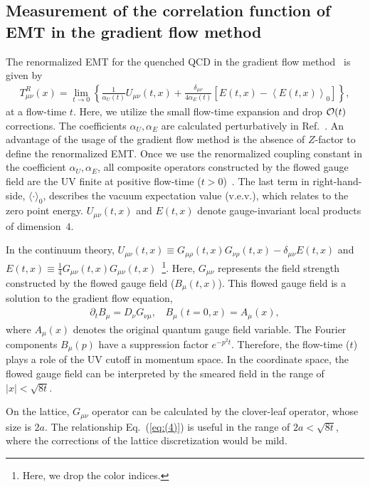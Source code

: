 \documentclass[a4paper,11pt]{article}
\newcommand\beq{ \begin{eqnarray} }
\newcommand\eeq{ \end{eqnarray} }
\begin{document}
\subsection{Measurement of the correlation function of EMT in the gradient flow method}\label{sec:EMT}
The renormalized EMT for the quenched QCD in the gradient flow method~\cite{Suzuki:2013gza} is given by 
\begin{align}
   T_{\mu\nu}^R(x)
   =\lim_{t\to0}\left\{\frac{1}{\alpha_U(t)}U_{\mu\nu}(t,x)
   +\frac{\delta_{\mu\nu}}{4\alpha_E(t)}
   \left[E(t,x)-\left\langle E(t,x)\right\rangle_0 \right]\right\},
\label{eq:(4)}
\end{align}
at a flow-time $t$.
Here, we utilize the small flow-time expansion and drop ${\cal O} (t)$ corrections.
The coefficients $\alpha_U,\alpha_E$ are calculated perturbatively in Ref.~\cite{Suzuki:2013gza}.
An advantage of the usage of the gradient flow method is the absence of $Z$-factor to define the renormalized EMT.
Once we use the renormalized coupling constant in the coefficient $\alpha_U, \alpha_E$, all composite operators constructed by the flowed gauge field are the UV finite at positive flow-time ($t>0$)~\cite{Luscher:2011bx}.
The last term in right-hand-side, $\langle\cdot\rangle_0$, describes the vacuum expectation value (v.e.v.), which relates to the zero point energy. 
$U_{\mu \nu}(t,x)$ and $E(t,x)$ denote gauge-invariant local products of dimension~$4$.


In the continuum theory,  
$U_{\mu\nu}(t,x)\equiv G_{\mu\rho}(t,x)G_{\nu\rho}(t,x)
-\delta_{\mu\nu} E(t,x)$
and~$E(t,x)\equiv\frac{1}{4}G_{\mu\nu}(t,x)G_{\mu\nu}(t,x)$~\footnote{Here, we drop the color indices.}.
Here, $G_{\mu \nu}$ represents the field strength constructed by the flowed gauge field ($B_{\mu}(t,x)$).
This flowed gauge field is a solution to the gradient flow equation,  
\beq
\partial_t B_{\mu} = D_{\nu} G_{\nu \mu}, ~~~~ B_{\mu} (t=0,x) = A_{\mu}(x),\label{eq:gflow}
\eeq
where $A_{\mu}(x)$ denotes the original quantum gauge field variable.
The Fourier components $B_\mu (p)$ have a suppression factor $e^{-p^2t}$.
 Therefore, the flow-time ($t$) plays a role of the UV cutoff in momentum space. 
In the coordinate space, the flowed gauge field can be interpreted by the smeared field in the range of $|x| < \sqrt{8t}$.

On the lattice, $G_{\mu \nu}$ operator can be calculated by the clover-leaf operator, whose size is $2a$.
The relationship Eq.~(\ref{eq:(4)}) is useful in the range of $2a < \sqrt{8t}$, where the corrections of the lattice discretization  would be mild.
\end{document}
